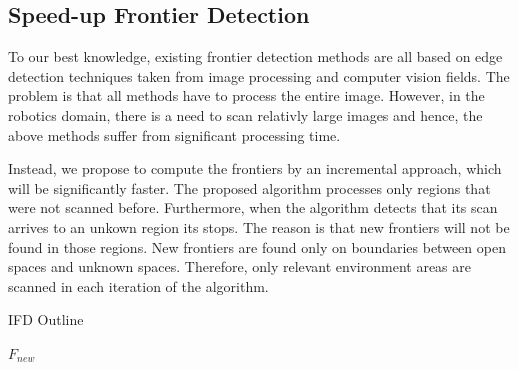 \documentclass[a4paper,10pt]{article}
\begin{document}
\subsection{Speed-up Frontier Detection}
\label{section:SpeedUpFrontierDetection}
To our best knowledge, existing frontier detection methods are all based on
edge detection techniques taken from image processing and computer vision
fields. The problem is that all methods have to process the entire image.
However, in the robotics domain, there is a need to scan relativly large images
and hence, the above methods suffer from significant processing time.

Instead, we propose to compute the frontiers by an incremental approach, which
will be significantly faster. The proposed algorithm processes only regions that
were not scanned before. Furthermore, when the algorithm detects that its scan
arrives to an unkown region its stops. The reason is that new frontiers will
not be found in those regions. New frontiers are found only on boundaries
between open spaces and unknown spaces. Therefore, only relevant environment
areas are scanned in each iteration of the algorithm.

\begin{algorithm}
\caption{IFD Outline}
\label{alg:IncrementalFrontierDetector}
\begin{algorithmic}[1]


 



\ENDIF
\ENDFOR
 
\ENDFOR
\RETURN $F_{new}$ 

\end{algorithmic}
\end{algorithm}
\end{document}
